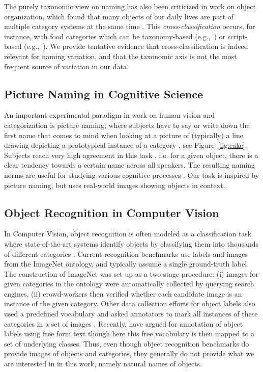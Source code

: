 The purely taxonomic view on naming has also been criticized in work on object organization, which found that many objects of our daily lives are part of multiple category systems at the same time \cite{ross1999food,SHAFTO20111}. 
This \textit{cross-classification} occurs, for instance, with food categories which can be taxonomy-based (e.g.,~) or script-based (e.g.,~).
We provide tentative evidence that cross-classification is indeed relevant for naming variation, and that the taxonomic axis is not the most frequent source of variation in our data.

\subsection{Picture Naming in Cognitive Science}

An important experimental paradigm in work on human vision and categorization is picture naming, where subjects have to say or write down the first name that comes to mind when looking at a picture of (typically) a line drawing depicting a prototypical instance of a category \cite{snodgrass,rossion2004revisiting}, see Figure\ \ref{fig:cake}.
Subjects reach very high agreement in this task \cite{rossion2004revisiting}, i.e. for a given object, there is a clear tendency towards a certain name across all speakers.
The resulting naming norms are useful for studying various cognitive processes \cite{humphreys1988cascade}.
Our task is inspired by picture naming, but uses real-world images showing objects in context.

\subsection{Object Recognition in Computer Vision}

In Computer Vision, object recognition is often modeled as a classification task where state-of-the-art systems identify objects by classifying them into thousands of different categories  \cite{googlenet,ILSVRC15}. 
Current recognition benchmarks use labels and images from the ImageNet \cite{imagenet_cvpr09} ontology, and typically assume a single ground-truth label. 
The construction of ImageNet was set up as a two-stage procedure: (i) images for given categories in the ontology were automatically collected by querying search engines, (ii) crowd-workers then verified whether each candidate image is an instance of the given category.
Other data collection efforts for object labels also used a predefined vocabulary and asked annotators to mark all instances of these categories in a set of images \cite{mscoco,OpenImages}. 
Recently,  have argued for annotation of object labels using free form text though here this free vocabulary is then mapped to a set of underlying classes.
Thus, even though object recognition benchmarks do provide images of objects and categories, they generally do not provide what we are interested in in this work, namely natural names of objects.

